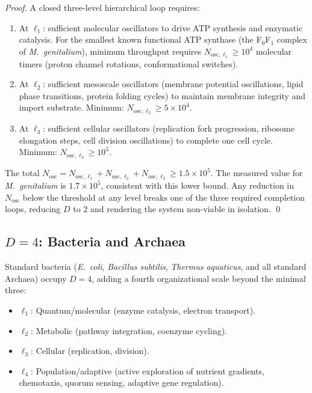 \begin{proof}
A closed three-level hierarchical loop requires:
\begin{enumerate}
  \item At $\ell_1$: sufficient molecular oscillators to drive ATP synthesis
        and enzymatic catalysis. For the smallest known functional ATP synthase
        (the F$_0$F$_1$ complex of \textit{M.~genitalium}), minimum throughput
        requires $N_{\mathrm{osc},\ell_1} \geq 10^4$ molecular timers
        (proton channel rotations, conformational switches).
  \item At $\ell_2$: sufficient mesoscale oscillators (membrane potential
        oscillations, lipid phase transitions, protein folding cycles) to
        maintain membrane integrity and import substrate. Minimum:
        $N_{\mathrm{osc},\ell_2} \geq 5 \times 10^4$.
  \item At $\ell_3$: sufficient cellular oscillators (replication fork
        progression, ribosome elongation steps, cell division oscillations)
        to complete one cell cycle. Minimum: $N_{\mathrm{osc},\ell_3} \geq
        10^5$.
\end{enumerate}
The total $N_{\mathrm{osc}} = N_{\mathrm{osc},\ell_1} + N_{\mathrm{osc},\ell_2}
+ N_{\mathrm{osc},\ell_3} \geq 1.5 \times 10^5$. The measured value for
\textit{M.~genitalium} is $1.7 \times 10^5$, consistent with this lower bound.
Any reduction in $N_{\mathrm{osc}}$ below the threshold at any level breaks
one of the three required completion loops, reducing $D$ to 2 and rendering
the system non-viable in isolation. \qed
\end{proof}

\subsection{$D = 4$: Bacteria and Archaea}

Standard bacteria (\textit{E.~coli}, \textit{Bacillus subtilis}, \textit{Thermus
aquaticus}, and all standard Archaea) occupy $D = 4$, adding a fourth
organizational scale beyond the minimal three:
\begin{itemize}
  \item $\ell_1$: Quantum/molecular (enzyme catalysis, electron transport).
  \item $\ell_2$: Metabolic (pathway integration, coenzyme cycling).
  \item $\ell_3$: Cellular (replication, division).
  \item $\ell_4$: Population/adaptive (active exploration of nutrient gradients,
        chemotaxis, quorum sensing, adaptive gene regulation).
\end{itemize}

